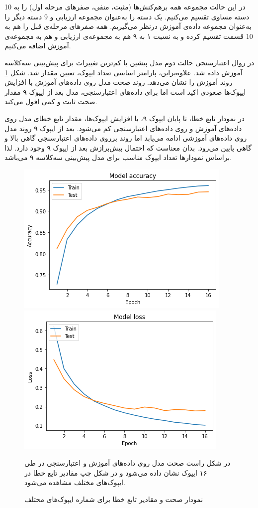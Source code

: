 در این حالت مجموعه همه برهم‌کنش‌ها (مثبت، منفی، صفرهای مرحله اول) را به 10 دسته مساوی تقسیم می‌کنیم. یک دسته را به‌عنوان مجموعه ارزیابی و 9 دسته دیگر را به‌عنوان مجموعه‌ داده‌ی آموزش درنظر می‌گیریم. همه صفرهای مرحله‌ی قبل را هم به 10 قسمت تقسیم کرده و به نسبت ۱ به ۹ هم به مجموعه‌ی ارزیابی و هم به مجموعه‌ی آموزش اضافه می‌کنیم.

در روال اعتبارسنجی حالت دوم مدل پیشین با کم‌ترین تغییرات برای پیش‌بینی سه‌کلاسه آموزش داده ‌شد. علاوه‌براین، پارامتر اساسی تعداد ایپوک، تعیین مقدار شد. شکل
\ref{lastTripleModel}
روند آموزش را نشان می‌دهد. روند صحت مدل روی داده‌های آموزش با افزایش ایپوک‌ها صعودی اکید است اما برای داده‌های اعتبارسنجی، مدل بعد از ایپوک ۹ مقدار صحت ثابت و کمی افول می‌کند.

در نمودار تابع خطا، تا پایان ایپوک ۹، با افزایش ایپوک‌ها، مقدار تابع خطای مدل روی داده‌های آموزش و رو‌ی داده‌های اعتبارسنجی کم می‌شود. بعد از ایپوک ۹ روند مدل روی داده‌های آموزشی ادامه می‌یابد اما روند برروی داده‌های اعتبارسنجی گاهی بالا و گاهی پایین می‌رود. بدان معناست که احتمال بیش‌برازش بعد از ایپوک ۹ وجود دارد. لذا براساس نمودارها تعداد ایپوک مناسب برای مدل پیش‌بینی سه‌کلاسه ۹ می‌باشد.
\begin{figure}[!h]
\begin{minipage}[b]{0.99\linewidth}
    \includegraphics[width=.55\textwidth]{section4/lastTripleModel/modelTripleACC.png}
    \includegraphics[width=.55\textwidth]{section4/lastTripleModel/modelTripleLoss.png}
\end{minipage}
	\caption{نمودار صحت و مقادیر تابع خطا برای شماره ایپوک‌های مختلف}
در شکل راست صحت مدل روی داده‌های آموزش و اعتبارسنجی در طی ۱۶ ایپوک نشان داده می‌شود و در شکل چپ مقادیر تابع خطا در ایپوک‌های مختلف مشاهده می‌شود.
\label{lastTripleModel}
\end{figure}

